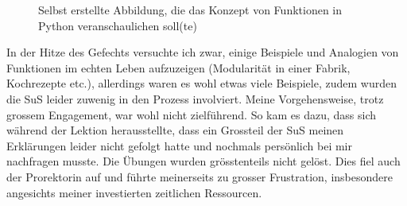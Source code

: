 \begin{myExBox}[title=Beispiel aus der eigenen Unterrichtserfahrung]
  \begin{figure}[H]
    \centering
    \caption*{Selbst erstellte Abbildung, die das Konzept von Funktionen in Python veranschaulichen soll(te)}
  \end{figure}
  In der Hitze des Gefechts versuchte ich zwar, einige Beispiele und Analogien von Funktionen im echten Leben aufzuzeigen (Modularität in einer Fabrik, Kochrezepte etc.), allerdings waren es wohl etwas viele Beispiele, zudem wurden die SuS leider zuwenig in den Prozess involviert. Meine Vorgehensweise, trotz grossem Engagement, war wohl nicht zielführend. So kam es dazu, dass sich während der Lektion herausstellte, dass ein Grossteil der SuS meinen Erklärungen leider nicht gefolgt hatte und nochmals persönlich bei mir nachfragen musste. Die Übungen wurden grösstenteils nicht gelöst. Dies fiel auch der Prorektorin auf und führte meinerseits zu grosser Frustration, insbesondere angesichts meiner investierten zeitlichen Ressourcen.

\end{myExBox}
\newpage

